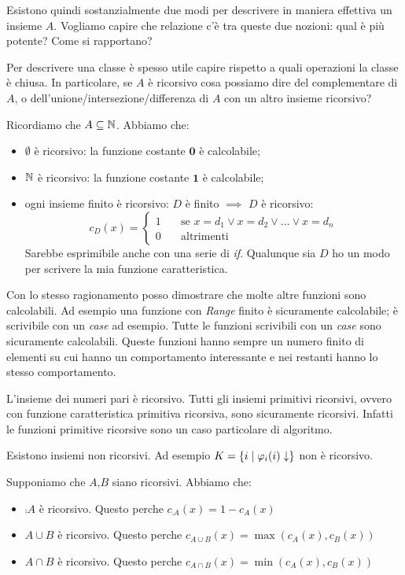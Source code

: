 Esistono quindi sostanzialmente due modi per descrivere in maniera effettiva un insieme $A$.
Vogliamo capire che relazione c'è tra queste due nozioni: qual è più potente? Come si rapportano?

Per descrivere una classe è spesso utile capire rispetto a quali operazioni la classe è chiusa. In
particolare, se $A$ è ricorsivo cosa possiamo dire del complementare di $A$, o
dell'unione/intersezione/differenza di $A$ con un altro insieme ricorsivo?

Ricordiamo che $A \subseteq \mathbb{N}$. Abbiamo che:
\begin{itemize}
    \item $\emptyset$ è ricorsivo: la funzione costante $\bm{0}$ è calcolabile;
    \item $\mathbb{N}$ è ricorsivo: la funzione costante $\bm{1}$ è calcolabile;
    \item ogni insieme finito è ricorsivo: $D$ è finito $\implies$ $D$ è ricorsivo:
    \begin{equation*}
        c_{D}(x) = 
        \begin{cases}
            1 \quad & \text{se $x = d_{1} \lor x = d_{2} \lor \dotsc \lor x = d_{n}$}  \\
            0 \quad & \text{altrimenti}
        \end{cases}
    \end{equation*}
    Sarebbe esprimibile anche con una serie di \textit{if}. Qualunque sia $D$ ho un modo per scrivere la mia
    funzione caratteristica.
\end{itemize}

Con lo stesso ragionamento posso dimostrare che molte altre funzioni sono calcolabili. Ad esempio
una funzione con \textit{Range} finito è sicuramente calcolabile; è scrivibile con un \textit{case}
ad esempio.  Tutte le funzioni scrivibili con un \textit{case} sono sicuramente calcolabili. Queste
funzioni hanno sempre un numero finito di elementi su cui hanno un comportamento interessante e nei
restanti hanno lo stesso comportamento.

L'insieme dei numeri pari è ricorsivo. Tutti gli insiemi primitivi ricorsivi, ovvero con funzione
caratteristica primitiva ricorsiva, sono sicuramente ricorsivi. Infatti le funzioni primitive
ricorsive sono un caso particolare di algoritmo.

Esistono insiemi non ricorsivi. Ad esempio $K = \{i \mid \varphi_{i}(i) \downarrow\}$ non è ricorsivo.

Supponiamo che $A$,$B$ siano ricorsivi. Abbiamo che:
\begin{itemize}
    \item $\comp{A}$ è ricorsivo. Questo perche $c_{\comp{A}}(x) = 1 - c_{A}(x)$
    \item $A \cup B$ è ricorsivo. Questo perche $c_{A \cup B}(x) = \max(c_{A}(x),c_{B}(x))$
    \item $A \cap B$ è ricorsivo. Questo perche $c_{A \cap B}(x) = \min(c_{A}(x),c_{B}(x))$
\end{itemize}

